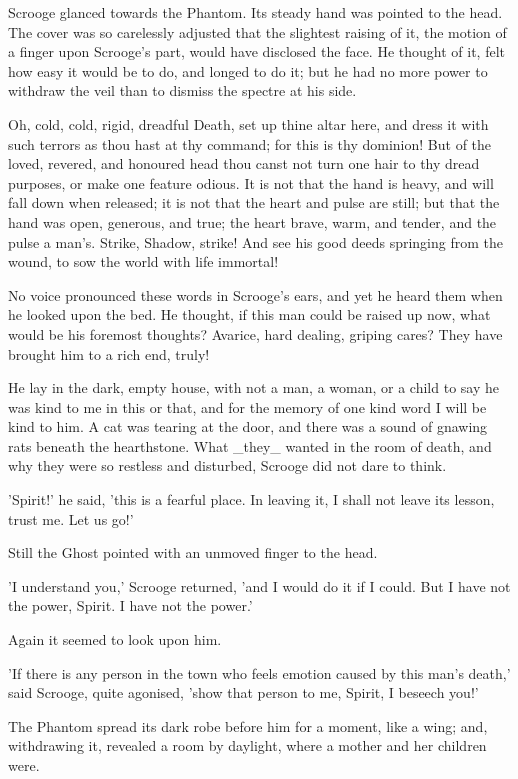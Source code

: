 Scrooge glanced towards the Phantom. Its steady hand was pointed to the
head. The cover was so carelessly adjusted that the slightest raising of
it, the motion of a finger upon Scrooge's part, would have disclosed the
face. He thought of it, felt how easy it would be to do, and longed to
do it; but he had no more power to withdraw the veil than to dismiss the
spectre at his side.

Oh, cold, cold, rigid, dreadful Death, set up thine altar here, and
dress it with such terrors as thou hast at thy command; for this is thy
dominion! But of the loved, revered, and honoured head thou canst not
turn one hair to thy dread purposes, or make one feature odious. It is
not that the hand is heavy, and will fall down when released; it is not
that the heart and pulse are still; but that the hand was open,
generous, and true; the heart brave, warm, and tender, and the pulse a
man's. Strike, Shadow, strike! And see his good deeds springing from the
wound, to sow the world with life immortal!

No voice pronounced these words in Scrooge's ears, and yet he heard them
when he looked upon the bed. He thought, if this man could be raised up
now, what would be his foremost thoughts? Avarice, hard dealing, griping
cares? They have brought him to a rich end, truly!

He lay in the dark, empty house, with not a man, a woman, or a child to
say he was kind to me in this or that, and for the memory of one kind
word I will be kind to him. A cat was tearing at the door, and there was
a sound of gnawing rats beneath the hearthstone. What _they_ wanted in
the room of death, and why they were so restless and disturbed, Scrooge
did not dare to think.

'Spirit!' he said, 'this is a fearful place. In leaving it, I shall not
leave its lesson, trust me. Let us go!'

Still the Ghost pointed with an unmoved finger to the head.

'I understand you,' Scrooge returned, 'and I would do it if I could. But
I have not the power, Spirit. I have not the power.'

Again it seemed to look upon him.

'If there is any person in the town who feels emotion caused by this
man's death,' said Scrooge, quite agonised, 'show that person to me,
Spirit, I beseech you!'

The Phantom spread its dark robe before him for a moment, like a wing;
and, withdrawing it, revealed a room by daylight, where a mother and her
children were.

